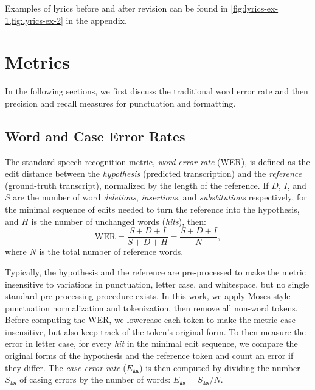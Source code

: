 \documentclass{article}
\newcommand{\case}{\texttt{Aa}}
\begin{document}
Examples of lyrics before and after revision can be found in \cref{fig:lyrics-ex-1,fig:lyrics-ex-2} in the appendix.

\section{Metrics}
In the following sections, we first discuss the traditional word error rate and then precision and recall measures for punctuation and formatting.
\subsection{Word and Case Error Rates}
\label{sec:wer}
The standard speech recognition metric, \emph{word error rate} (WER), is defined as the edit distance between the \emph{hypothesis} (predicted transcription) and the \emph{reference} (ground-truth transcript), normalized by the length of the reference.
If $D$, $I$, and $S$ are the number of word \emph{deletions}, \emph{insertions}, and \emph{substitutions} respectively, for the minimal sequence of edits needed to turn the reference into the hypothesis, and $H$ is the number of unchanged words (\emph{hits}), then:
\begin{equation}
    \text{WER} = \frac{S+D+I}{S+D+H} = \frac{S+D+I}{N},
\end{equation}
where $N$ is the total number of reference words.

Typically, the hypothesis and the reference are pre-processed to make the metric insensitive to variations in punctuation, letter case, and whitespace, but no single standard pre-processing procedure exists.
In this work, we apply Moses-style \cite{koehn-etal-2007-moses} punctuation normalization and tokenization, then remove all non-word tokens.
Before computing the WER, we lowercase each token to make the metric case-insensitive, but also keep track of the token's original form.
To then measure the error in letter case, 
for every \emph{hit} in the minimal edit sequence, we compare the original forms of the hypothesis and the reference token and count an error if they differ. The \emph{case error rate} ($E_\case$) is then computed by dividing the number $S_\case$ of casing errors by the number of words: $E_\case=S_\case/N$.
\end{document}
